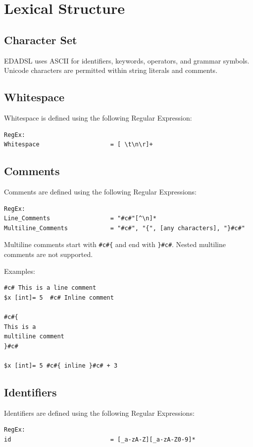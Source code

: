 \chapter{Lexical Structure}
\section{Character Set}
EDADSL uses ASCII for identifiers, keywords, operators, and grammar symbols. Unicode characters are permitted within string literals and comments.
\section{Whitespace}
Whitespace is defined using the following Regular Expression:
\begin{verbatim}
RegEx:
Whitespace                    = [ \t\n\r]+
\end{verbatim}

\section{Comments}
Comments are defined using the following Regular Expressions:
\begin{verbatim}
RegEx:
Line_Comments                 = "#c#"[^\n]*
Multiline_Comments            = "#c#", "{", [any characters], "}#c#"
\end{verbatim}

Multiline comments start with \texttt{\#c\#\{} and end with \texttt{\}#c\#}. Nested multiline comments are not supported.

Examples:
\begin{verbatim}
#c# This is a line comment
$x [int]= 5  #c# Inline comment

#c#{
This is a
multiline comment
}#c#

$x [int]= 5 #c#{ inline }#c# + 3
\end{verbatim}

\section{Identifiers}
Identifiers are defined using the following Regular Expressions:
\begin{verbatim}
RegEx:
id                            = [_a-zA-Z][_a-zA-Z0-9]*
\end{verbatim}

